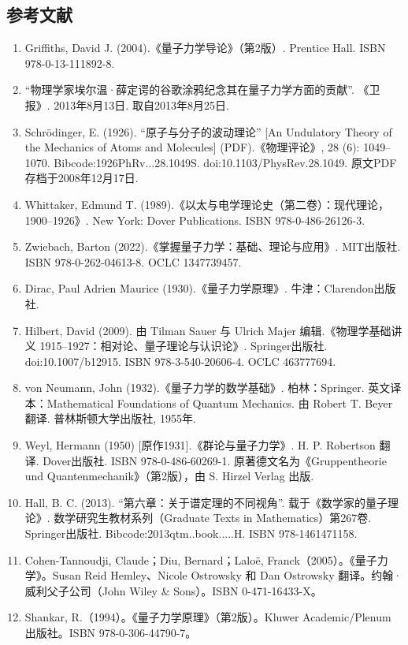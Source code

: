 \subsection{参考文献}
\begin{enumerate}
\item Griffiths, David J. (2004).《量子力学导论》（第2版）. Prentice Hall. ISBN 978-0-13-111892-8.
\item “物理学家埃尔温·薛定谔的谷歌涂鸦纪念其在量子力学方面的贡献”. 《卫报》. 2013年8月13日. 取自2013年8月25日.
\item Schrödinger, E. (1926). “原子与分子的波动理论” [An Undulatory Theory of the Mechanics of Atoms and Molecules] (PDF).《物理评论》, 28 (6): 1049–1070. Bibcode:1926PhRv...28.1049S. doi:10.1103/PhysRev.28.1049. 原文PDF存档于2008年12月17日.
\item Whittaker, Edmund T. (1989).《以太与电学理论史（第二卷）：现代理论，1900–1926》. New York: Dover Publications. ISBN 978-0-486-26126-3.
\item Zwiebach, Barton (2022).《掌握量子力学：基础、理论与应用》. MIT出版社. ISBN 978-0-262-04613-8. OCLC 1347739457.
\item Dirac, Paul Adrien Maurice (1930).《量子力学原理》. 牛津：Clarendon出版社.
\item Hilbert, David (2009). 由 Tilman Sauer 与 Ulrich Majer 编辑.《物理学基础讲义 1915–1927：相对论、量子理论与认识论》. Springer出版社. doi:10.1007/b12915. ISBN 978-3-540-20606-4. OCLC 463777694.
\item von Neumann, John (1932).《量子力学的数学基础》. 柏林：Springer. 英文译本：Mathematical Foundations of Quantum Mechanics. 由 Robert T. Beyer 翻译. 普林斯顿大学出版社, 1955年.
\item Weyl, Hermann (1950) [原作1931].《群论与量子力学》. H. P. Robertson 翻译. Dover出版社. ISBN 978-0-486-60269-1. 原著德文名为《Gruppentheorie und Quantenmechanik》（第2版），由 S. Hirzel Verlag 出版.
\item Hall, B. C. (2013). “第六章：关于谱定理的不同视角”. 载于《数学家的量子理论》. 数学研究生教材系列（Graduate Texts in Mathematics）第267卷. Springer出版社. Bibcode:2013qtm..book.....H. ISBN 978-1461471158.
\item Cohen-Tannoudji, Claude；Diu, Bernard；Laloë, Franck（2005）。《量子力学》。Susan Reid Hemley、Nicole Ostrowsky 和 Dan Ostrowsky 翻译。约翰·威利父子公司（John Wiley & Sons）。ISBN 0-471-16433-X。
\item Shankar, R.（1994）。《量子力学原理》（第2版）。Kluwer Academic/Plenum 出版社。ISBN 978-0-306-44790-7。

\end{enumerate}

